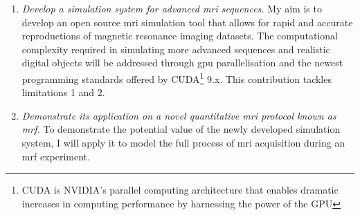 \begin{enumerate}
    
	\item \textit{Develop a simulation system for advanced \ac{mri} sequences.}
	My aim is to develop an open source \ac{mri} simulation tool that allows for rapid and accurate reproductions of magnetic resonance imaging datasets.
	The computational complexity required in simulating more advanced sequences and realistic digital objects will be addressed
    through \ac{gpu} parallelisation and the newest programming standards offered by CUDA\footnote{CUDA is NVIDIA's parallel computing architecture that enables dramatic increases in computing performance by harnessing the power of the GPU} 9.x.
    This contribution tackles limitations 1 and 2.
	
	\item \textit{Demonstrate its application on a novel quantitative \ac{mri} protocol known as \ac{mrf}.}
	To demonstrate the potential value of the newly developed simulation system, I will apply it to model the full process of \ac{mri} acquisition during an \ac{mrf} experiment.
	


\end{enumerate}
